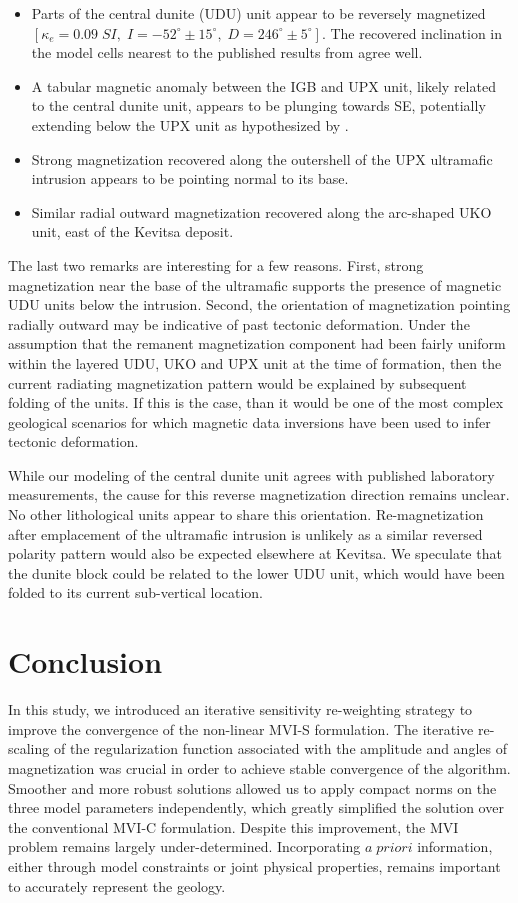 \documentclass[paper]{geophysics}
\begin{document}
\begin{itemize}
\item Parts of the central dunite (UDU) unit appear to be reversely magnetized $[\kappa_{e} = 0.09\;SI, \;I=-52^\circ \pm 15^\circ, \;D=246^\circ \pm 5^\circ]$. The recovered inclination in the model cells nearest to the published results from \cite{Montonen2012} agree well.
\item A tabular magnetic anomaly between the IGB and UPX unit, likely related to the central dunite unit, appears to be plunging towards SE, potentially extending below the UPX unit as hypothesized by \cite{Koivisto2015}.
\item Strong magnetization recovered along the outershell of the UPX ultramafic intrusion appears to be pointing normal to its base.
\item Similar radial outward magnetization recovered along the arc-shaped UKO unit, east of the Kevitsa deposit.
\end{itemize}
The last two remarks are interesting for a few reasons. First, strong magnetization near the base of the ultramafic supports the presence of magnetic UDU units below the intrusion.
Second, the orientation of magnetization pointing radially outward may be indicative of past tectonic deformation.
Under the assumption that the remanent magnetization component had been fairly uniform within the layered UDU, UKO and UPX unit at the time of formation, then the current radiating magnetization pattern would be explained by subsequent folding of the units.
If this is the case, than it would be one of the most complex geological scenarios for which magnetic data inversions have been used to infer tectonic deformation.

While our modeling of the central dunite unit agrees with published laboratory measurements, the cause for this reverse magnetization direction remains unclear. No other lithological units appear to share this orientation. Re-magnetization after emplacement of the ultramafic intrusion is unlikely as a similar reversed polarity pattern would also be expected elsewhere at Kevitsa. We speculate that the dunite block could be related to the lower UDU unit, which would have been folded to its current sub-vertical location.


\section{Conclusion}
In this study, we introduced an iterative sensitivity re-weighting strategy to improve the convergence of the non-linear MVI-S formulation.
The iterative re-scaling of the regularization function associated with the amplitude and angles of magnetization was crucial in order to achieve stable convergence of the algorithm.
Smoother and more robust solutions allowed us to apply compact norms on the three model parameters independently, which greatly simplified the solution over the conventional MVI-C formulation. Despite this improvement, the MVI problem remains largely under-determined. Incorporating $a \; priori$ information, either through model constraints or joint physical properties, remains important to accurately represent the geology.
\end{document}
